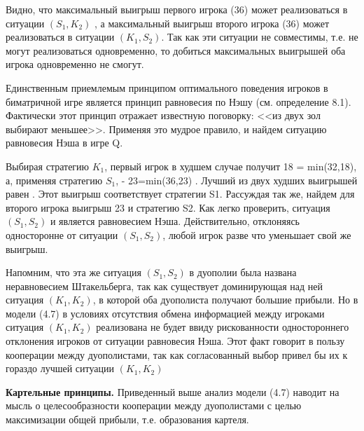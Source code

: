 \documentclass[12pt, 4paper]{book}
\begin{document}
{Видно, что максимальный выигрыш первого игрока (36) может реализоваться в ситуации $(S_1,K_2)$ , а максимальный выигрыш второго игрока (36) может реализоваться в ситуации $(K_1,S_2)$. Так как эти ситуации не совместимы, т.е. не могут реализоваться одновременно, то добиться максимальных выигрышей оба игрока одновременно не смогут.
\par

Единственным приемлемым принципом оптимального поведения игроков в биматричной игре является принцип равновесия по Нэшу (см. определение 8.1). Фактически этот принцип отражает известную поговорку: <<из двух зол выбирают меньшее>>. Применяя это мудрое правило, и найдем ситуацию равновесия Нэша в игре Q.
\par

Выбирая стратегию $K_1$, первый игрок в худшем случае получит 18 = min(32,18), а, применяя стратегию $S_1$, - 23=min(36,23) . Лучший из двух худших выигрышей равен . Этот выигрыш соответствует стратегии S1. Рассуждая так же, найдем для второго игрока выигрыш 23 и стратегию S2. Как легко проверить, ситуация $(S_1,S_2)$ и является равновесием Нэша. Действительно, отклоняясь односторонне от ситуации $(S_1,S_2)$, любой игрок разве что уменьшает свой же выигрыш.
\par

Напомним, что эта же ситуация $(S_1,S_2)$ в дуополии была названа неравновесием Штакельберга, так как существует доминирующая над ней ситуация $(K_1,K_2)$, в которой оба дуополиста получают большие прибыли. Но в модели (4.7) в условиях отсутствия обмена информацией между игроками ситуация $(K_1,K_2)$ реализована не будет ввиду рискованности одностороннего отклонения игроков от ситуации равновесия Нэша. Этот факт говорит в пользу кооперации между дуополистами, так как согласованный выбор привел бы их к гораздо лучшей ситуации $(K_1,K_2)$
\par

\textbf{Картельные принципы.} Приведенный выше анализ модели (4.7) наводит на мысль о целесообразности кооперации между дуополистами с целью максимизации общей прибыли, т.е. образования картеля.
\par

}
\end{document}

